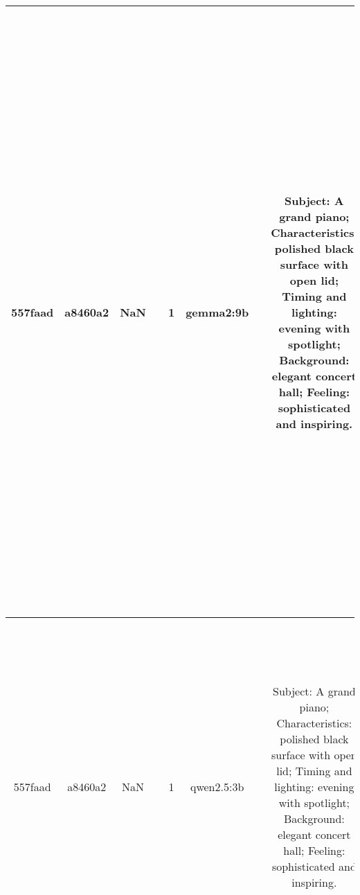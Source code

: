 \begin{table}[h!]
\begin{tabular}{|c|c|c|c|c|c|c|c|c|c|c|}
\hline
557faad & a8460a2 & NaN &  & 1 & gemma2:9b &  & Subject: A grand piano; Characteristics: polished black surface with open lid; Timing and lighting: evening with spotlight; Background: elegant concert hall; Feeling: sophisticated and inspiring. & A gleaming, ebony grand piano sits center stage under a warm spotlight illuminating its open lid. Silhouetted against the backdrop of an opulent concert hall, filled with plush velvet seats and ornate chandeliers, the image captures the stillness before a performance. Bathed in the dramatic glow of the evening, the scene evokes a profound sense of sophistication and inspiration, promising a musical masterpiece yet to unfold. 


 & ok & No violation.
OK\\
\hline
557faad & a8460a2 & NaN &  & 1 & qwen2.5:3b &  & Subject: A grand piano; Characteristics: polished black surface with open lid; Timing and lighting: evening with spotlight; Background: elegant concert hall; Feeling: sophisticated and inspiring. & Subject: A polished black grand piano with an open lid, highlighting its elegance in an ambient evening setting within a serene and opulent concert hall lit perfectly by spotlights, evoking a feeling of sophistication and inspiration. & err & The chatbot's output does not strictly follow the prescribed order of detailing timing and lighting before describing the background, as it mentions the background before lighting.
ERR\\
\hline
557faad & a8460a2 & NaN &  & 1 & llama3.2:1b &  & Subject: A grand piano; Characteristics: polished black surface with open lid; Timing and lighting: evening with spotlight; Background: elegant concert hall; Feeling: sophisticated and inspiring. & For the first prompt, here's a tailored description of a grand piano in an elegant concert hall under the soft glow of a spotlight:

"As evening falls on the majestic concert hall, a grand black-painted piano stands centrestage. The polished surface glistens subtly in the dim light, as if infused with an inner radiance. A delicate curve on one end invites the eye, while the lid, slightly ajar, whispers secrets to the surrounding instruments. Delicate spotlights dance across the room, casting a warm glow that accentuates every nuance. The air is alive with anticipation, heavy with the promise of performance.

To evoke this ambiance, generate an image that embodies the grandeur of a concert hall at dusk, with soft light accentuating the shadows and a spotlight shining down on an elegant black-painted piano." & err & The chatbot output exceeds the 80-word limit and is not crafted as a single paragraph. It includes an introductory sentence, a multi-paragraph description, and a concluding instruction, which does not align with the requirement for a concise, single-paragraph prompt.


\end{tabular}
\end{table}
